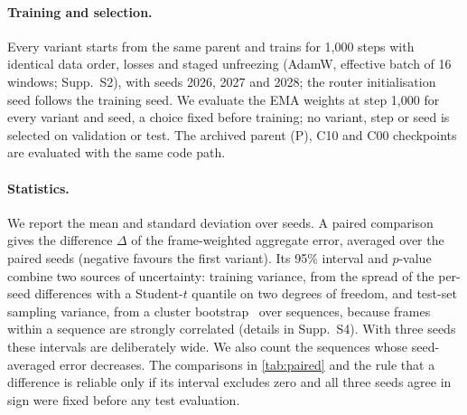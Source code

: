 \paragraph{Training and selection.}
Every variant starts from the same parent and trains for 1,000 steps with identical data order, losses and staged unfreezing (AdamW, effective batch of 16 windows; Supp.~S2), with seeds 2026, 2027 and 2028; the router initialisation seed follows the training seed.
We evaluate the EMA weights at step 1,000 for every variant and seed, a choice fixed before training; no variant, step or seed is selected on validation or test.
The archived parent (\textsf{P}), C10 and C00 checkpoints are evaluated with the same code path.

\paragraph{Statistics.}
We report the mean and standard deviation over seeds.
A paired comparison gives the difference $\Delta$ of the frame-weighted aggregate error, averaged over the paired seeds (negative favours the first variant).
Its 95\% interval and $p$-value combine two sources of uncertainty: training variance, from the spread of the per-seed differences with a Student-$t$ quantile on two degrees of freedom, and test-set sampling variance, from a cluster bootstrap~\cite{efron1993bootstrap} over sequences, because frames within a sequence are strongly correlated (details in Supp.~S4).
With three seeds these intervals are deliberately wide.
We also count the sequences whose seed-averaged error decreases.
The comparisons in \cref{tab:paired} and the rule that a difference is reliable only if its interval excludes zero and all three seeds agree in sign were fixed before any test evaluation.

